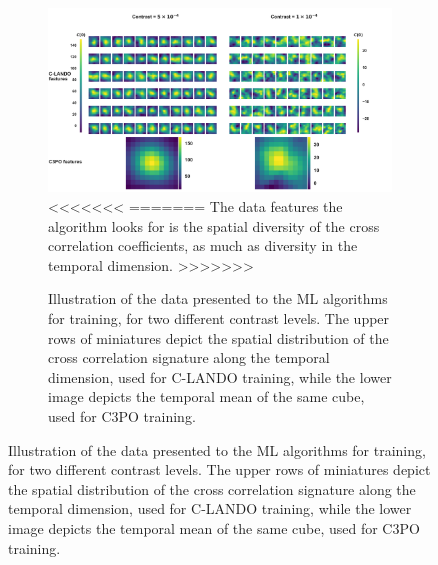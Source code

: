 \documentclass{aa}
\begin{document}
{{{\begin{figure}[t]
{\begin{figure}
\centering
\includegraphics[width=\textwidth]{fig5_disc_dec2023_cropped.png}
<<<<<<<
=======
The data features the algorithm looks for is the spatial diversity of the cross correlation coefficients, as much as diversity in the temporal dimension.
>>>>>>>
\caption{Illustration of the data presented to the ML algorithms for training, for two different contrast levels. The upper rows of miniatures depict the spatial distribution of the cross correlation signature along the temporal dimension, used for C-LANDO training, while the lower image depicts the temporal mean of the same cube, used for C3PO training. }
\label{fig:disc-part1}
\end{figure}

}
\end{figure}}}}
\end{document}
